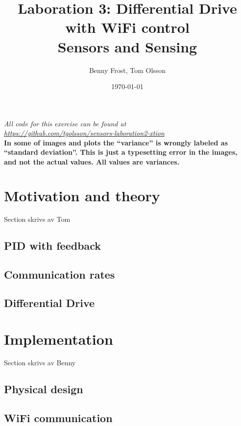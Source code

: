 \documentclass[11pt]{article}
\title{Laboration 3: Differential Drive with WiFi control\\ {\small Sensors and Sensing}} \author{Benny Frost, Tom Olsson}
\date{\today}
\begin{document}
\maketitle %
\begin{center}
  \emph{All code for this exercise can be found at \\ \url{https://github.com/tgolsson/sensors-laboration2-xtion}} \\ \vspace{10pt}
  \textbf{\Large In some of images and plots the ``variance'' is wrongly labeled as
    ``standard deviation''. This is just a typesetting error in the images, and
    not the actual values. All values are variances.}
\end{center}
\tableofcontents
\lstlistoflistings %
\listoffigures %
\listoftables \lstset{
  matchrangestart=t} %


\section{Motivation and theory}
Section skrivs av Tom
\subsection{PID with feedback}
\subsection{Communication rates}
\label{subsec:cr}
\subsection{Differential Drive}

\section{Implementation}
Section skrivs av Benny
\subsection{Physical design}

\subsection{WiFi communication}
\end{document}
